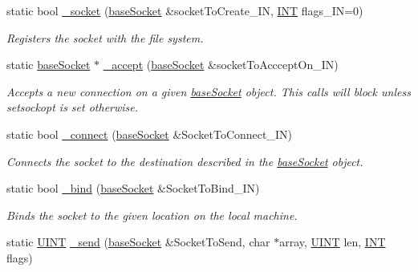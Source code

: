 \begin{DoxyCompactItemize}
\item 
static bool \hyperlink{class_communication_1_1_o_s_ab3ce5ee10f85abdf1c3d258132d12b78}{\+\_\+socket} (\hyperlink{class_communication_1_1base_socket}{base\+Socket} \&socket\+To\+Create\+\_\+\+I\+N, \hyperlink{typedefs_8h_a0240b856f74f8905ed334a5a0ca624e5}{I\+N\+T} flags\+\_\+\+I\+N=0)
\begin{DoxyCompactList}\small\item\em Registers the socket with the file system. \end{DoxyCompactList}\item 
static \hyperlink{class_communication_1_1base_socket}{base\+Socket} $\ast$ \hyperlink{class_communication_1_1_o_s_a449cc9a8cd90440f7ca83315bceabebf}{\+\_\+accept} (\hyperlink{class_communication_1_1base_socket}{base\+Socket} \&socket\+To\+Acccept\+On\+\_\+\+I\+N)
\begin{DoxyCompactList}\small\item\em Accepts a new connection on a given \hyperlink{class_communication_1_1base_socket}{base\+Socket} object. This calls will block unless setsockopt is set otherwise. \end{DoxyCompactList}\item 
static bool \hyperlink{class_communication_1_1_o_s_a927b094016b9c8b5dec6756ab958bea0}{\+\_\+connect} (\hyperlink{class_communication_1_1base_socket}{base\+Socket} \&Socket\+To\+Connect\+\_\+\+I\+N)
\begin{DoxyCompactList}\small\item\em Connects the socket to the destination described in the \hyperlink{class_communication_1_1base_socket}{base\+Socket} object. \end{DoxyCompactList}\item 
static bool \hyperlink{class_communication_1_1_o_s_a7815dee0292a83340b8b4a4a16906aad}{\+\_\+bind} (\hyperlink{class_communication_1_1base_socket}{base\+Socket} \&Socket\+To\+Bind\+\_\+\+I\+N)
\begin{DoxyCompactList}\small\item\em Binds the socket to the given location on the local machine. \end{DoxyCompactList}\item 
static \hyperlink{typedefs_8h_a2e2c38961834f28c06e17e074eb00bc7}{U\+I\+N\+T} \hyperlink{class_communication_1_1_o_s_af6ca3ef21b995019d6d8bbf86204ba80}{\+\_\+send} (\hyperlink{class_communication_1_1base_socket}{base\+Socket} \&Socket\+To\+Send, char $\ast$array, \hyperlink{typedefs_8h_a2e2c38961834f28c06e17e074eb00bc7}{U\+I\+N\+T} len, \hyperlink{typedefs_8h_a0240b856f74f8905ed334a5a0ca624e5}{I\+N\+T} flags)

\end{DoxyCompactItemize}

